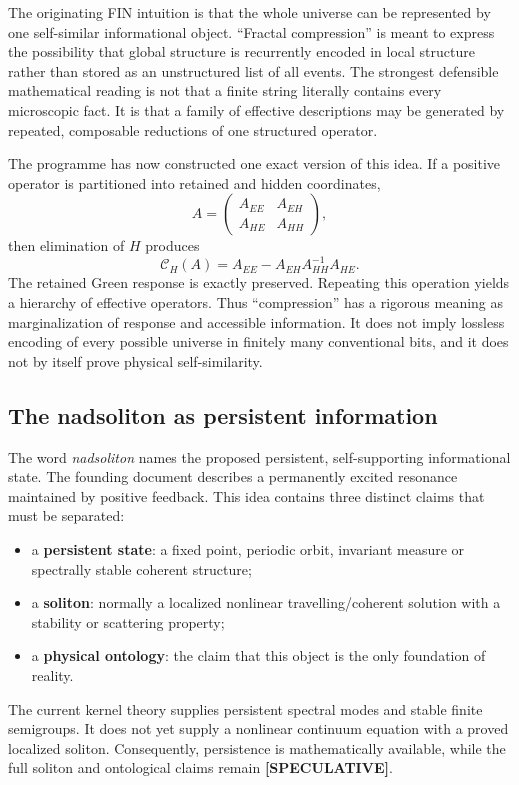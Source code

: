 \documentclass[11pt,a4paper]{article}
\theoremstyle{definition}
\theoremstyle{remark}
\newcommand{\status}[2]{\textcolor{#1}{\textbf{[#2]}}}
\newcommand{\speculative}{\status{finpurple}{SPECULATIVE}}
\begin{document}
The originating FIN intuition is that the whole universe can be represented by one self-similar informational object. ``Fractal compression'' is meant to express the possibility that global structure is recurrently encoded in local structure rather than stored as an unstructured list of all events. The strongest defensible mathematical reading is not that a finite string literally contains every microscopic fact. It is that a family of effective descriptions may be generated by repeated, composable reductions of one structured operator.

The programme has now constructed one exact version of this idea. If a positive operator is partitioned into retained and hidden coordinates,
\[
A=\begin{pmatrix}A_{EE}&A_{EH}\\A_{HE}&A_{HH}\end{pmatrix},
\]
then elimination of $H$ produces
\[
\mathcal C_H(A)=A_{EE}-A_{EH}A_{HH}^{-1}A_{HE}.
\]
The retained Green response is exactly preserved. Repeating this operation yields a hierarchy of effective operators. Thus ``compression'' has a rigorous meaning as marginalization of response and accessible information. It does not imply lossless encoding of every possible universe in finitely many conventional bits, and it does not by itself prove physical self-similarity.

\subsection{The nadsoliton as persistent information}

The word \emph{nadsoliton} names the proposed persistent, self-supporting informational state. The founding document describes a permanently excited resonance maintained by positive feedback. This idea contains three distinct claims that must be separated:

\begin{itemize}
\item a \textbf{persistent state}: a fixed point, periodic orbit, invariant measure or spectrally stable coherent structure;
\item a \textbf{soliton}: normally a localized nonlinear travelling/coherent solution with a stability or scattering property;
\item a \textbf{physical ontology}: the claim that this object is the only foundation of reality.
\end{itemize}

The current kernel theory supplies persistent spectral modes and stable finite semigroups. It does not yet supply a nonlinear continuum equation with a proved localized soliton. Consequently, persistence is mathematically available, while the full soliton and ontological claims remain \speculative.
\end{document}

